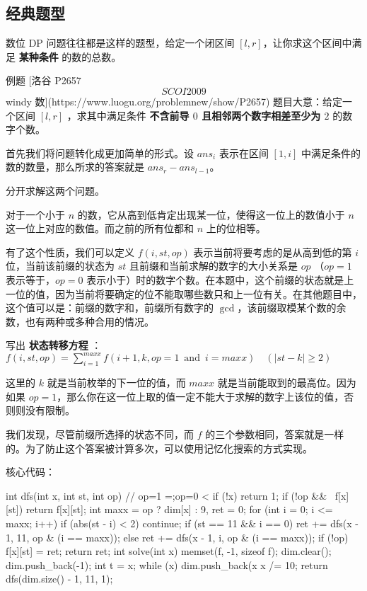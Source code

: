 
\subsection{经典题型}

数位 DP 问题往往都是这样的题型，给定一个闭区间 $[l,r]$，让你求这个区间中满足 \textbf{某种条件} 的数的总数。

\begin{NOTE}{ 例题 [洛谷 P2657 \[SCOI2009\] windy 数](https://www.luogu.org/problemnew/show/P2657)}{}
题目大意：给定一个区间 $[l,r]$ ，求其中满足条件 \textbf{不含前导 $0$ 且相邻两个数字相差至少为 $2$} 的数字个数。
\end{NOTE}


首先我们将问题转化成更加简单的形式。设 $ans_i$ 表示在区间 $[1,i]$ 中满足条件的数的数量，那么所求的答案就是 $ans_r-ans_{l-1}$。

分开求解这两个问题。

对于一个小于 $n$ 的数，它从高到低肯定出现某一位，使得这一位上的数值小于 $n$ 这一位上对应的数值。而之前的所有位都和 $n$ 上的位相等。

有了这个性质，我们可以定义 $f(i,st,op)$ 表示当前将要考虑的是从高到低的第 $i$ 位，当前该前缀的状态为 $st$ 且前缀和当前求解的数字的大小关系是 $op$ （$op=1$ 表示等于，$op=0$ 表示小于）时的数字个数。在本题中，这个前缀的状态就是上一位的值，因为当前将要确定的位不能取哪些数只和上一位有关。在其他题目中，这个值可以是：前缀的数字和，前缀所有数字的 $\gcd$，该前缀取模某个数的余数，也有两种或多种合用的情况。

写出 \textbf{状态转移方程} ： $f(i,st,op)=\sum_{i=1}^{maxx} f(i+1,k,op=1~ \operatorname{and}~ i=maxx )\quad (|st-k|\ge 2)$

这里的 $k$ 就是当前枚举的下一位的值，而 $maxx$ 就是当前能取到的最高位。因为如果 $op=1$，那么你在这一位上取的值一定不能大于求解的数字上该位的值，否则则没有限制。

我们发现，尽管前缀所选择的状态不同，而 $f$ 的三个参数相同，答案就是一样的。为了防止这个答案被计算多次，可以使用记忆化搜索的方式实现。

核心代码：

\begin{cppcode}
int dfs(int x, int st, int op)  // op=1 =;op=0 <
{
  if (!x) return 1;
  if (!op && ~f[x][st]) return f[x][st];
  int maxx = op ? dim[x] : 9, ret = 0;
  for (int i = 0; i <= maxx; i++) {
    if (abs(st - i) < 2) continue;
    if (st == 11 && i == 0)
      ret += dfs(x - 1, 11, op & (i == maxx));
    else
      ret += dfs(x - 1, i, op & (i == maxx));
  }
  if (!op) f[x][st] = ret;
  return ret;
}
int solve(int x) {
  memset(f, -1, sizeof f);
  dim.clear();
  dim.push_back(-1);
  int t = x;
  while (x) {
    dim.push_back(x %
    x /= 10;
  }
  return dfs(dim.size() - 1, 11, 1);
}
\end{cppcode}

